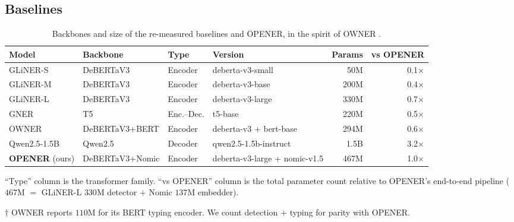 \subsection{Baselines}
\label{sec:exp:baselines}

\begin{table}[H]
\centering
\caption{Backbones and size of the re-measured baselines and OPENER, in the spirit of OWNER \cite{genest2025owner}.}
\label{tab:baselines}
\footnotesize
\setlength{\tabcolsep}{4.5pt}
\begin{threeparttable}
\begin{tabular}{@{}llllrr@{}}
\toprule
Model & Backbone & Type & Version & Params & vs OPENER \\
\midrule
GLiNER-S & DeBERTaV3 & Encoder & deberta-v3-small & 50M & 0.1$\times$ \\
GLiNER-M & DeBERTaV3 & Encoder & deberta-v3-base & 200M & 0.4$\times$ \\
GLiNER-L & DeBERTaV3 & Encoder & deberta-v3-large & 330M & 0.7$\times$ \\
GNER & T5 & Enc.--Dec. & t5-base & 220M & 0.5$\times$ \\
OWNER\tnote{$\dagger$} & DeBERTaV3+BERT & Encoder & deberta-v3 + bert-base & 294M & 0.6$\times$ \\
Qwen2.5-1.5B & Qwen2.5 & Decoder & qwen2.5-1.5b-instruct & 1.5B & 3.2$\times$ \\
\midrule
\rowcolor{hlorange} \textbf{OPENER} (ours) & DeBERTaV3+Nomic & Encoder & deberta-v3-large + nomic-v1.5 & 467M & 1.0$\times$ \\
\bottomrule
\end{tabular}
\begin{tablenotes}[flushleft]
\footnotesize
\item ``Type'' column is the transformer family. ``vs OPENER'' column is the total parameter count relative to OPENER's end-to-end pipeline ($467$M $=$ GLiNER-L $330$M detector $+$ Nomic $137$M embedder).
\item[$\dagger$] OWNER reports $110$M for its BERT typing encoder. We count detection $+$ typing for parity with OPENER.
\end{tablenotes}
\end{threeparttable}
\end{table}


